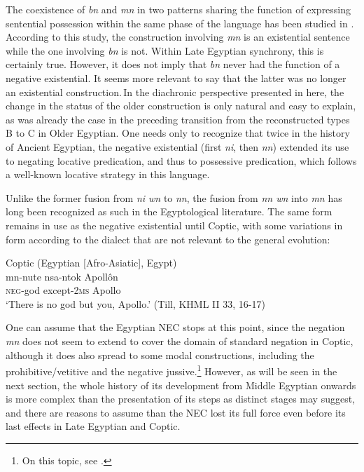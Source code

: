 \documentclass[output=paper]{langsci/langscibook}
\begin{document}
The coexistence of \textit{bn} and \textit{mn} in two patterns sharing the function of expressing sentential possession within the same phase of the language has been studied in \cite{Depuydt2008}.
According to this study, the construction involving \textit{mn} is an existential sentence while the one involving \textit{bn} is not. Within Late Egyptian synchrony, this is certainly true. However, it does not imply that \textit{bn} never had the function of a negative existential. It seems more relevant to say that the latter was no longer an existential construction. In the diachronic perspective presented in here, the change in the status of the older construction is only natural and easy to explain, as was already the case in the preceding transition from the reconstructed types B to C in Older Egyptian. One needs only to recognize that twice in the history of Ancient Egyptian, the negative existential (first \textit{ni}, then \textit{nn}) extended its use to negating locative predication, and thus to possessive predication, which follows a well-known locative strategy in this language. 
 
Unlike the former fusion from \textit{ni wn} to \textit{nn}, the fusion from \textit{nn wn} into \textit{mn} has long been recognized as such in the Egyptological literature. The same form remains in use as the negative existential until Coptic, with some variations in form according to the dialect that are not relevant to the general evolution:  

\ea Coptic (Egyptian [Afro-Asiatic], Egypt) \label{ex:AE45}\\
    \gll mn-nute nsa-ntok Apollôn \\
    \textsc{neg}-god except-\textsc{2ms} Apollo\\ 
    \glt ‘There is no god but you, Apollo.’ (Till, KHML II 33, 16-17)
\z
 
One can assume that the Egyptian NEC stops at this point, since the negation \textit{mn} does not seem to extend to cover the domain of standard negation in Coptic, although it does also spread to some modal constructions, including the prohibitive/vetitive and the negative jussive.\footnote{On this topic, see \cite{GrossmanPolisforthcoming}.}
However, as will be seen in the next section, the whole history of its development from Middle Egyptian onwards is more complex than the presentation of its steps as distinct stages may suggest, and there are reasons to assume than the NEC lost its full force even before its last effects in Late Egyptian and Coptic. 
\end{document}
